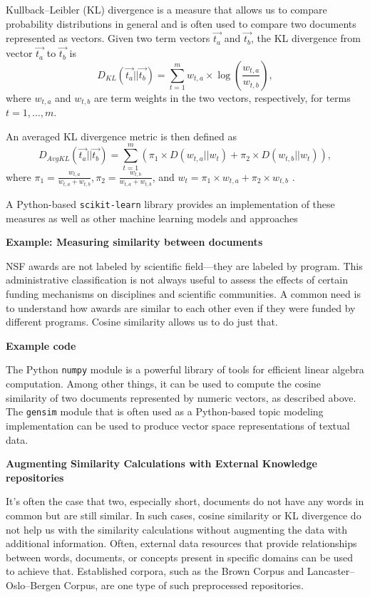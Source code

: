 \documentclass[]{krantz}
\begin{document}
Kullback--Leibler (KL) divergence is a measure that allows us to compare
probability distributions in general and is often used to compare two
documents represented as vectors. Given two term vectors
\(\overrightarrow{t_a}\) and \(\overrightarrow{t_b}\), the KL divergence
from vector \(\overrightarrow{t_a}\) to \(\overrightarrow{t_b}\) is
\[D_{KL}(\overrightarrow{t_a}||\overrightarrow{t_b}) =
\sum\limits_{t=1}^m w_{t,a}\times
\log\left(\frac{w_{t,a}}{w_{t,b}}\right),\] where \(w_{t,a}\) and
\(w_{t,b}\) are term weights in the two vectors, respectively, for terms
\(t=1, \ldots, m\).

An averaged KL divergence metric is then defined as
\[D_{AvgKL}(\overrightarrow{t_a}||\overrightarrow{t_b}) = \sum\limits_{t=1}^m (\pi_1\times D(w_{t,a}||w_t)+\pi_2\times D(w_{t,b}||w_t)),\]
where
\(\pi_1 = \frac{w_{t,a}}{w_{t,a}+w_{t,b}}, \pi_2 = \frac{w_{t,b}}{w_{t,a}+w_{t,b}}\),
and \(w_t = \pi_1\times w_{t,a} + \pi_2\times w_{t,b}\)
\citep{huang-08}.

A Python-based \texttt{scikit-learn} library provides an implementation
of these measures as well as other machine learning models and
approaches

\textbf{Example: Measuring similarity between documents}

NSF awards are not labeled by scientific field---they are labeled by
program. This administrative classification is not always useful to
assess the effects of certain funding mechanisms on disciplines and
scientific communities. A common need is to understand how awards are
similar to each other even if they were funded by different programs.
Cosine similarity allows us to do just that.

\textbf{Example code}

The Python \texttt{numpy} module is a powerful library of tools for
efficient linear algebra computation. Among other things, it can be used
to compute the cosine similarity of two documents represented by numeric
vectors, as described above. The \texttt{gensim} module that is often
used as a Python-based topic modeling implementation can be used to
produce vector space representations of textual data.

\textbf{Augmenting Similarity Calculations with External Knowledge
repositories}

It's often the case that two, especially short, documents do not have
any words in common but are still similar. In such cases, cosine
similarity or KL divergence do not help us with the similarity
calculations without augmenting the data with additional information.
Often, external data resources that provide relationships between words,
documents, or concepts present in specific domains can be used to
achieve that. Established corpora, such as the Brown Corpus and
Lancaster--Oslo--Bergen Corpus, are one type of such preprocessed
repositories.
\end{document}
